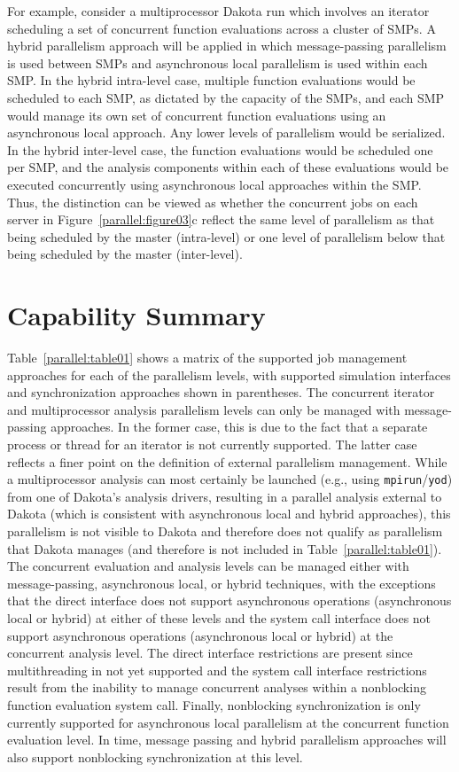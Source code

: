 For example, consider a multiprocessor Dakota run which involves an
iterator scheduling a set of concurrent function evaluations across a
cluster of SMPs. A hybrid parallelism approach will be applied in
which message-passing parallelism is used between SMPs and
asynchronous local parallelism is used within each SMP. In the hybrid
intra-level case, multiple function evaluations would be scheduled to
each SMP, as dictated by the capacity of the SMPs, and each SMP would
manage its own set of concurrent function evaluations using an
asynchronous local approach. Any lower levels of parallelism would be
serialized. In the hybrid inter-level case, the function evaluations
would be scheduled one per SMP, and the analysis components within
each of these evaluations would be executed concurrently using
asynchronous local approaches within the SMP. Thus, the distinction
can be viewed as whether the concurrent jobs on each server in
Figure~\ref{parallel:figure03}c reflect the same level of parallelism
as that being scheduled by the master (intra-level) or one level of
parallelism below that being scheduled by the master (inter-level).


\section{Capability Summary}\label{parallel:summary}


Table~\ref{parallel:table01} shows a matrix of the supported job
management approaches for each of the parallelism levels, with
supported simulation interfaces and synchronization approaches shown
in parentheses. The concurrent iterator and multiprocessor analysis
parallelism levels can only be managed with message-passing
approaches. In the former case, this is due to the fact that a
separate process or thread for an iterator is not currently supported.
The latter case reflects a finer point on the definition of external
parallelism management. While a multiprocessor analysis can most
certainly be launched (e.g., using \texttt{mpirun}/\texttt{yod}) from
one of Dakota's analysis drivers, resulting in a parallel analysis
external to Dakota (which is consistent with asynchronous local and
hybrid approaches), this parallelism is not visible to Dakota and
therefore does not qualify as parallelism that Dakota manages (and
therefore is not included in Table~\ref{parallel:table01}). The
concurrent evaluation and analysis levels can be managed either with
message-passing, asynchronous local, or hybrid techniques, with the
exceptions that the direct interface does not support asynchronous
operations (asynchronous local or hybrid) at either of these levels
and the system call interface does not support asynchronous operations
(asynchronous local or hybrid) at the concurrent analysis level. The
direct interface restrictions are present since multithreading in not
yet supported and the system call interface restrictions result from
the inability to manage concurrent analyses within a nonblocking
function evaluation system call.  Finally, nonblocking synchronization
is only currently supported for asynchronous local parallelism at the
concurrent function evaluation level.  In time, message passing and
hybrid parallelism approaches will also support nonblocking
synchronization at this level.

